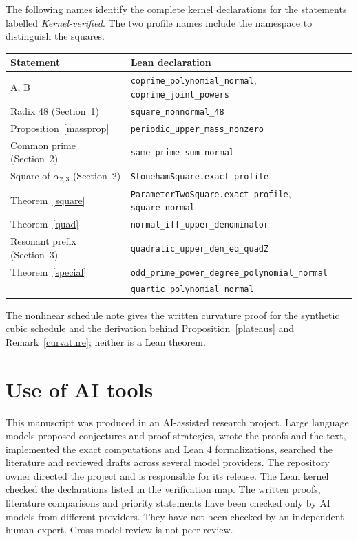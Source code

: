 \documentclass[11pt]{article}
\begin{document}
The following names identify the complete kernel declarations for the
statements labelled \emph{Kernel-verified}. The two profile names include
the namespace to distinguish the squares.
\begin{center}\small
\begin{tabular}{@{}ll@{}}
\toprule Statement & Lean declaration \\ \midrule
A, B & \texttt{coprime\_polynomial\_normal}, \texttt{coprime\_joint\_powers}\\
Radix 48 (Section~1) & \texttt{square\_nonnormal\_48}\\
Proposition~\ref{massprop} & \texttt{periodic\_upper\_mass\_nonzero}\\
Common prime (Section~2) & \texttt{same\_prime\_sum\_normal}\\
Square of \(\alpha_{2,3}\) (Section~2) & \texttt{StonehamSquare.exact\_profile}\\
Theorem~\ref{square} & \texttt{ParameterTwoSquare.exact\_profile}, \texttt{square\_normal}\\
Theorem~\ref{quad} & \texttt{normal\_iff\_upper\_denominator}\\
Resonant prefix (Section~3) & \texttt{quadratic\_upper\_den\_eq\_quadZ}\\
Theorem~\ref{special} & \texttt{odd\_prime\_power\_degree\_polynomial\_normal}\\
 & \texttt{quartic\_polynomial\_normal}\\ \bottomrule
\end{tabular}
\end{center}
The \href{https://github.com/eldernos/MathematicsResearch/blob/c2c9da683666b3b9368e5d4b5cb858caccf528f5/notes/phase19/nonlinear.md}{nonlinear schedule note}
gives the written curvature proof for the synthetic cubic schedule and
the derivation behind Proposition~\ref{plateaus} and
Remark~\ref{curvature}; neither is a Lean theorem.

\section{Use of AI tools}
This manuscript was produced in an AI-assisted research project. Large language models proposed conjectures and proof strategies, wrote the proofs and the text, implemented the exact computations and Lean 4 formalizations, searched the literature and reviewed drafts across several model providers. The repository owner directed the project and is responsible for its release. The Lean kernel checked the declarations listed in the verification map. The written proofs, literature comparisons and priority statements have been checked only by AI models from different providers. They have not been checked by an independent human expert. Cross-model review is not peer review.


\end{document}
